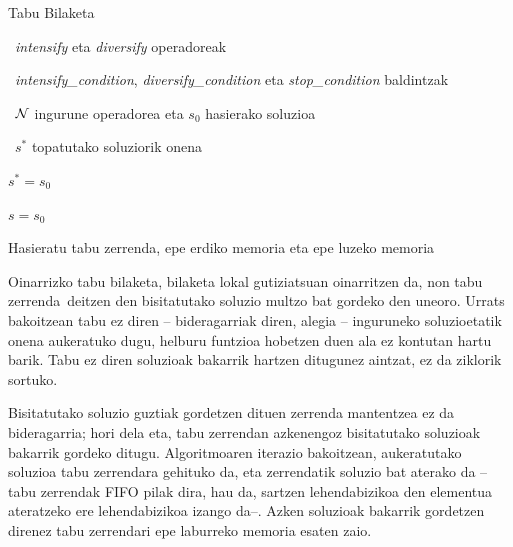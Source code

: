 \documentclass[eu]{ifirak}\usepackage[]{graphicx}\usepackage[]{color}
\newcommand{\zkk}{\guillemotleft}
\newcommand{\skk}{\guillemotright}
\begin{document}
\begin{ifalgorithm}[t]
\begin{ifpseudo}{Tabu Bilaketa}
\item \In\ \textit{intensify} eta \textit{diversify} operadoreak
\item \In\ \textit{intensify\_condition}, \textit{diversify\_condition} eta \textit{stop\_condition} baldintzak
\item \In\ $\cal N$ ingurune operadorea eta $s_0$ hasierako soluzioa
\item \Out\ $s^*$ topatutako soluziorik onena
\item $s^*=s_0$
\item $s = s_0$
\item Hasieratu tabu zerrenda, epe erdiko memoria eta epe luzeko memoria
\item {}
\item {}
\item {}
\item {}
\item {}
\item {}
\item \T{\EIf}
\item {}
\item {}
\item \T{\EIf}
\item \Done
\end{ifpseudo}
\caption{Tabu bilaketaren sasikodea}\label{alg:tabu}
\end{ifalgorithm}


Oinarrizko tabu bilaketa, bilaketa lokal gutiziatsuan oinarritzen da, non \zkk tabu zerrenda\skk\ deitzen den bisitatutako soluzio multzo bat gordeko den uneoro. Urrats bakoitzean tabu ez diren -- bideragarriak diren, alegia -- inguruneko soluzioetatik onena aukeratuko dugu, helburu funtzioa hobetzen duen ala ez kontutan hartu barik. Tabu ez diren soluzioak bakarrik hartzen ditugunez aintzat, ez da ziklorik sortuko.

Bisitatutako soluzio guztiak gordetzen dituen zerrenda mantentzea ez da bideragarria; hori dela eta, tabu zerrendan azkenengoz bisitatutako soluzioak bakarrik gordeko ditugu. Algoritmoaren iterazio bakoitzean, aukeratutako soluzioa tabu zerrendara gehituko da, eta zerrendatik soluzio bat aterako da -- tabu zerrendak FIFO pilak dira, hau da, sartzen lehendabizikoa den elementua ateratzeko ere lehendabizikoa izango da--. Azken soluzioak bakarrik gordetzen direnez tabu zerrendari epe laburreko memoria esaten zaio.
\end{document}
